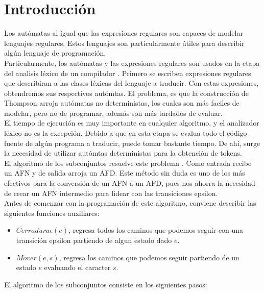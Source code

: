 \section{Introducción}

Los autómatas al igual que las expresiones regulares son capaces de modelar lenguajes regulares. Estos lenguajes son particularmente útiles para describir algún lenguaje de programación. \\

Particularmente, los autómatas y las expresiones regulares son usados en la etapa del analisis léxico de un compilador \cite{automatas}. Primero se escriben expresiones regulares que describiran a las clases léxicas del lenguaje a traducir. Con estas expresiones, obtendremos sus respectivos autómtas. El problema, es que la construcción de Thompson arroja autómatas no deterministas, los cuales son más faciles de modelar, pero no de programar, además son más tardados de evaluar. \\

El tiempo de ejecución es muy importante en cualquier algoritmo, y el analizador léxico no es la excepción. Debido a que en esta etapa se evalua todo el código fuente de algún programa a traducir, puede tomar bastante tiempo. De ahi, surge la necesidad de utilizar autómtas deterministas para la obtención de tokens. \\

El algoritmo de los subconjuntos resuelve este problema \cite{compiladores}. Como entrada recibe un AFN y de salida arroja un AFD. Este método sin duda es uno de los más efectivos para la conversión de un AFN a un AFD, pues nos ahorra la necesidad de crear un AFN intermedio para lidear con las transiciones epsilon. \\

Antes de comenzar con la programación de este algoritmo, conviene describir las siguientes funciones auxiliares:

\begin{itemize}
	\item $Cerradura \epsilon (e)$, regresa todos los caminos que podemos seguir con una transición epsilon partiendo de algun estado dado $e$.
	\item $Mover(e,s)$, regresa los caminos que podemos seguir partiendo de un estado $e$ evaluando el caracter $s$.
\end{itemize}

El algoritmo de los subconjuntos consiste en los siguientes pasos:

